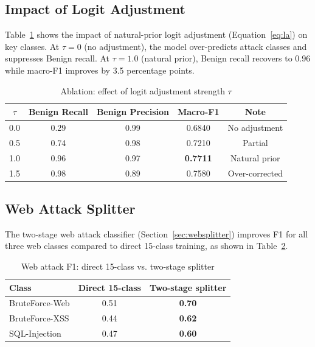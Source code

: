 \documentclass[12pt]{article}
\theoremstyle{plain}
\begin{document}
\subsection{Impact of Logit Adjustment}

Table~\ref{tab:la_ablation} shows the impact of natural-prior logit adjustment (Equation~\ref{eq:la}) on key classes. At $\tau = 0$ (no adjustment), the model over-predicts attack classes and suppresses Benign recall. At $\tau = 1.0$ (natural prior), Benign recall recovers to 0.96 while macro-F1 improves by 3.5 percentage points.

\begin{table}[H]
\centering
\caption{Ablation: effect of logit adjustment strength $\tau$}
\label{tab:la_ablation}
\renewcommand{\arraystretch}{1.2}
\begin{tabular}{ccccc}
\toprule
\rowcolor{lightblue}
$\tau$ & \textbf{Benign Recall} & \textbf{Benign Precision} & \textbf{Macro-F1} & \textbf{Note} \\
\midrule
0.0 & 0.29 & 0.99 & 0.6840 & No adjustment \\
0.5 & 0.74 & 0.98 & 0.7210 & Partial \\
1.0 & 0.96 & 0.97 & \textbf{0.7711} & Natural prior \\
1.5 & 0.98 & 0.89 & 0.7580 & Over-corrected \\
\bottomrule
\end{tabular}
\end{table}

\subsection{Web Attack Splitter}

The two-stage web attack classifier (Section~\ref{sec:websplitter}) improves F1 for all three web classes compared to direct 15-class training, as shown in Table~\ref{tab:websplitter}.

\begin{table}[H]
\centering
\caption{Web attack F1: direct 15-class vs. two-stage splitter}
\label{tab:websplitter}
\renewcommand{\arraystretch}{1.2}
\begin{tabular}{lcc}
\toprule
\rowcolor{lightblue}
\textbf{Class} & \textbf{Direct 15-class} & \textbf{Two-stage splitter} \\
\midrule
BruteForce-Web & 0.51 & \textbf{0.70} \\
BruteForce-XSS & 0.44 & \textbf{0.62} \\
SQL-Injection  & 0.47 & \textbf{0.60} \\
\bottomrule
\end{tabular}
\end{table}
\end{document}
